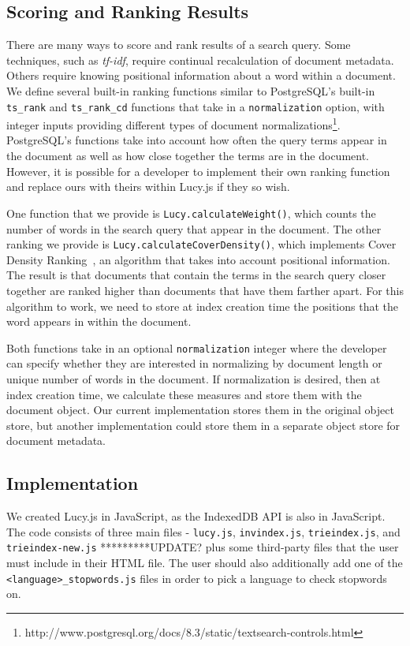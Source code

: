 \documentclass{vldb}
\begin{document}
\subsection{Scoring and Ranking Results}

There are many ways to score and rank results of a search query. Some techniques, such as \textit{tf-idf}, require continual recalculation of document metadata. Others require knowing positional information about a word within a document. We define several built-in ranking functions similar to PostgreSQL's built-in \texttt{ts\_rank} and \texttt{ts\_rank\_cd} functions that take in a \texttt{normalization} option, with integer inputs providing different types of document normalizations\footnote{http://www.postgresql.org/docs/8.3/static/textsearch-controls.html}.
PostgreSQL's functions take into account how often the query terms appear in the document as well as how close together the terms are in the document. However, it is possible for a developer to implement their own ranking function and replace ours with theirs within Lucy.js if they so wish.

One function that we provide is \texttt{Lucy.calculateWeight()}, which counts the number of words in the search query that appear in the document. The other ranking we provide is \texttt{Lucy.calculateCoverDensity()}, which implements Cover Density Ranking~\cite{li2002improvement}, an algorithm that takes into account positional information. The result is that documents that contain the terms in the search query closer together are ranked higher than documents that have them farther apart. For this algorithm to work, we need to store at index creation time the positions that the word appears in within the document. 

Both functions take in an optional \texttt{normalization} integer where the developer can specify whether they are interested in normalizing by document length or unique number of words in the document. If normalization is desired, then at index creation time, we calculate these measures and store them with the document object. Our current implementation stores them in the original object store, but another implementation could store them in a separate object store for document metadata.

\subsection{Implementation}

We created Lucy.js in JavaScript, as the IndexedDB API is also in JavaScript. The code consists of three main files - \texttt{lucy.js}, \texttt{invindex.js}, \texttt{trieindex.js},  and \texttt{trieindex-new.js} *********UPDATE? plus some third-party files that the user must include in their HTML file. The user should also additionally add one of the \texttt{<language>\_stopwords.js} files in order to pick a language to check stopwords on.
\end{document}
